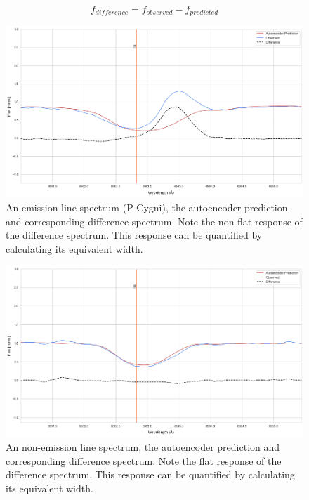 \begin{equation}
   f_{difference} = f_{observed} - f_{predicted}
\end{equation}

\begin{figure}[!htb]
\centering
\includegraphics[scale=0.45]{figures/normal difference.png}
\caption{An emission line spectrum (P Cygni), the autoencoder prediction and corresponding difference spectrum. Note the non-flat response of the difference spectrum. This response can be quantified by calculating its equivalent width.}
\end{figure}

\begin{figure}[!htb]
\centering
\includegraphics[scale=0.45]{figures/non emission difference.png}
\caption{An non-emission line spectrum, the autoencoder prediction and corresponding difference spectrum. Note the flat response of the difference spectrum. This response can be quantified by calculating its equivalent width.}
\end{figure}

